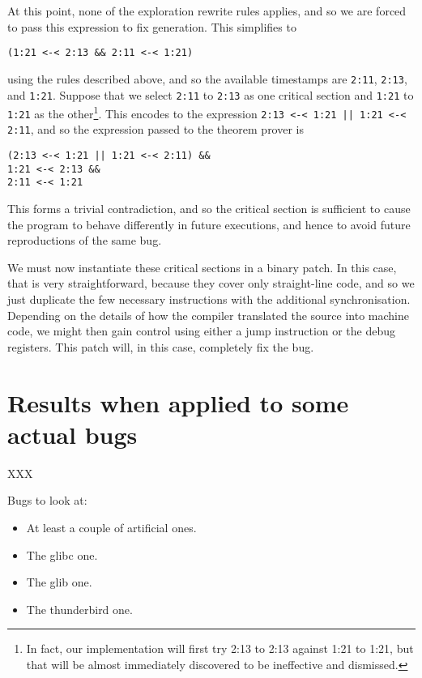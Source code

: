 \documentclass[10pt,a4paper,twocolumn]{article}
\begin{document}
At this point, none of the exploration rewrite rules applies, and so
we are forced to pass this expression to fix generation.  This
simplifies to

\begin{verbatim}
(1:21 <-< 2:13 && 2:11 <-< 1:21)
\end{verbatim}

using the rules described above, and so the available timestamps are
\verb|2:11|, \verb|2:13|, and \verb|1:21|.  Suppose that we select
\verb|2:11| to \verb|2:13| as one critical section and \verb|1:21| to
\verb|1:21| as the other\footnote{In fact, our implementation will
  first try 2:13 to 2:13 against 1:21 to 1:21, but that will be almost
  immediately discovered to be ineffective and dismissed.}.  This
encodes to the expression \verb^2:13 <-< 1:21 || 1:21 <-< 2:11^, and
so the expression passed to the theorem prover is

\begin{verbatim}
(2:13 <-< 1:21 || 1:21 <-< 2:11) &&
1:21 <-< 2:13 &&
2:11 <-< 1:21
\end{verbatim}

This forms a trivial contradiction, and so the critical section is
sufficient to cause the program to behave differently in future
executions, and hence to avoid future reproductions of the same bug.

We must now instantiate these critical sections in a binary patch.  In
this case, that is very straightforward, because they cover only
straight-line code, and so we just duplicate the few necessary
instructions with the additional synchronisation.  Depending on the
details of how the compiler translated the source into machine code,
we might then gain control using either a jump instruction or the
debug registers.  This patch will, in this case,
completely fix the bug.

\section{Results when applied to some actual bugs}

XXX

Bugs to look at:

\begin{itemize}
\item At least a couple of artificial ones.
\item The glibc one.
\item The glib one.
\item The thunderbird one.
\end{itemize}
\end{document}
